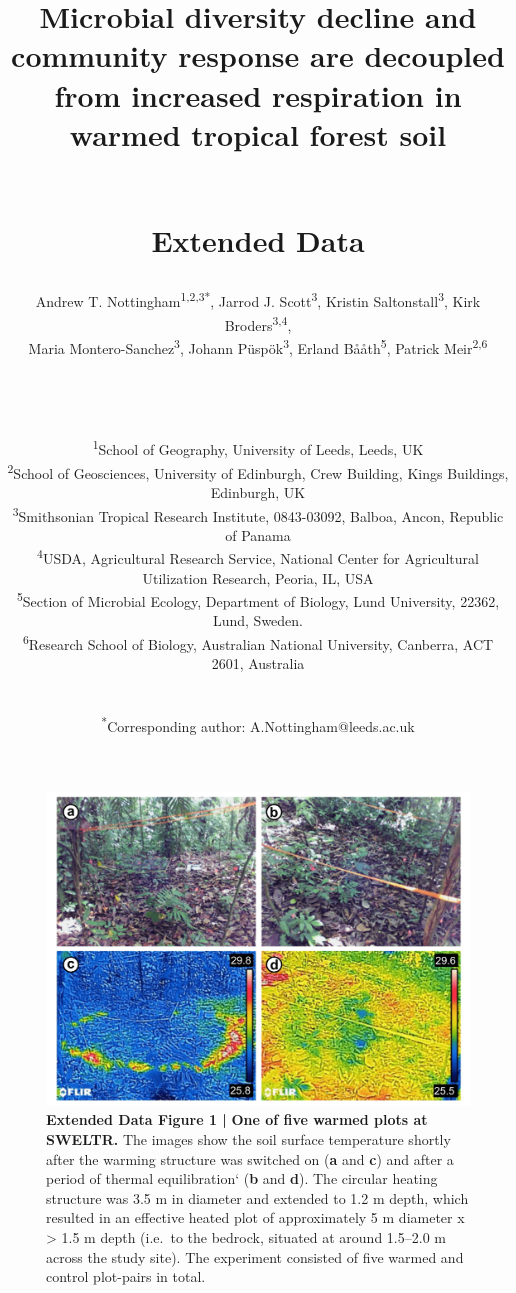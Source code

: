 \documentclass[
  letterpaper,
  DIV=11,
  numbers=noendperiod]{scrartcl}
\date{}
\title{\LARGE Microbial diversity decline and community response are
decoupled from increased respiration in warmed tropical forest soil\\
\strut \\
Extended Data}
\author{Andrew T. Nottingham\textsuperscript{1,2,3*}, Jarrod J.
Scott\textsuperscript{3}, Kristin Saltonstall\textsuperscript{3}, Kirk
Broders\textsuperscript{3,4},\\
Maria Montero-Sanchez\textsuperscript{3}, Johann
Püspök\textsuperscript{3}, Erland Bååth\textsuperscript{5}, Patrick
Meir\textsuperscript{2,6}\\
\strut \\
\strut \\
\RaggedRight \small \textsuperscript{1}School of Geography, University
of Leeds, Leeds, UK\\
\small \textsuperscript{2}School of Geosciences, University of
Edinburgh, Crew Building, Kings Buildings, Edinburgh, UK\\
\small \textsuperscript{3}Smithsonian Tropical Research Institute,
0843-03092, Balboa, Ancon, Republic of Panama\\
\small \textsuperscript{4}USDA, Agricultural Research Service, National
Center for Agricultural Utilization Research, Peoria, IL, USA\\
\small \textsuperscript{5}Section of Microbial Ecology, Department of
Biology, Lund University, 22362, Lund, Sweden.\\
\small \textsuperscript{6}Research School of Biology, Australian
National University, Canberra, ACT 2601, Australia\\
\strut \\
\small \textsuperscript{*}Corresponding author:
A.Nottingham@leeds.ac.uk}
\date{}
\begin{document}
\maketitle
\ifdefined\Shaded\renewenvironment{Shaded}{\begin{tcolorbox}[borderline west={3pt}{0pt}{shadecolor}, interior hidden, breakable, sharp corners, enhanced, boxrule=0pt, frame hidden]}{\end{tcolorbox}}\fi

\begin{figure}

{\centering \includegraphics[width=1\textwidth,height=\textheight]{FIGURES/Extended_Data_Fig_1.png}

}

\caption{\textbf{Extended Data Figure 1 |}
\textbf{One of five warmed plots at SWELTR.} The images show the soil
surface temperature shortly after the warming structure was switched on
(\textbf{a} and \textbf{c}) and after a period of thermal equilibration`
(\textbf{b} and \textbf{d}). The circular heating structure was 3.5 m in
diameter and extended to 1.2 m depth, which resulted in an effective
heated plot of approximately 5 m diameter x \textgreater{} 1.5 m depth
(i.e.~to the bedrock, situated at around 1.5--2.0 m across the study
site). The experiment consisted of five warmed and control plot-pairs in
total.}

\end{figure}
\end{document}
